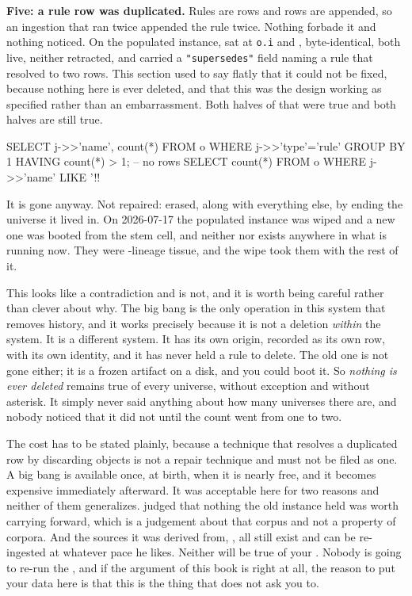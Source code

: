 \textbf{Five: a rule row was duplicated.} Rules are rows and rows are appended, so an ingestion that ran twice appended the rule twice. Nothing forbade it and nothing noticed. On the populated instance,  sat at \texttt{o.i} \labLineageRuleRowA{} and \labLineageRuleRowB{}, byte-identical, both live, neither retracted, and  carried a \texttt{"supersedes"} field naming a rule that resolved to two rows. This section used to say flatly that it could not be fixed, because nothing here is ever deleted, and that this was the design working as specified rather than an embarrassment. Both halves of that were true and both halves are still true.

\begin{Check}
SELECT j->>'name', count(*) FROM o WHERE j->>'type'='rule'
 GROUP BY 1 HAVING count(*) > 1;   -- no rows
SELECT count(*) FROM o WHERE j->>'name' LIKE '!\labLineageRule!%
\end{Check}

It is gone anyway. Not repaired: erased, along with everything else, by ending the universe it lived in. On 2026-07-17 the populated instance was wiped and a new one was booted from the stem cell, and neither  nor  exists anywhere in what is running now. They were \labLineage{}-lineage tissue, and the wipe took them with the rest of it.

This looks like a contradiction and is not, and it is worth being careful rather than clever about why. The big bang is the only operation in this system that removes history, and it works precisely because it is not a deletion \emph{within} the system. It is a different system. It has its own origin, recorded as its own row, with its own identity, and it has never held a \texttt{\labLineageRule} rule to delete. The old one is not gone either; it is a frozen artifact on a disk, and you could boot it. So \textit{nothing is ever deleted} remains true of every universe, without exception and without asterisk. It simply never said anything about how many universes there are, and nobody noticed that it did not until the count went from one to two.

The cost has to be stated plainly, because a technique that resolves a duplicated row by discarding \labLineageObjects{} objects is not a repair technique and must not be filed as one. A big bang is available once, at birth, when it is nearly free, and it becomes expensive immediately afterward. It was acceptable here for two reasons and neither of them generalizes. \labPI{} judged that nothing the old instance held was worth carrying forward, which is a judgement about that corpus and not a property of corpora. And the sources it was derived from, \labLineageSource{}, all still exist and can be re-ingested at whatever pace he likes. Neither will be true of your \labRuns{}. Nobody is going to re-run the \labColdSystemShort{}, and if the argument of this book is right at all, the reason to put your data here is that this is the thing that does not ask you to.

